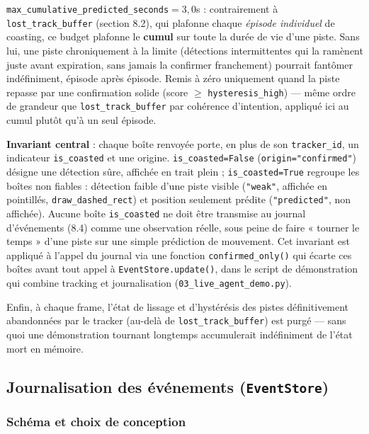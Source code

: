 \documentclass[11pt,a4paper]{article}
\let\Oldsubsection\subsection
\renewcommand{\subsection}{\FloatBarrier\Oldsubsection}
\let\Oldsubsubsection\subsubsection
\renewcommand{\subsubsection}{\FloatBarrier\Oldsubsubsection}
\begin{document}
\begin{itemize}[leftmargin=1.5em]
        \texttt{max\_cumulative\_predicted\_seconds}$=3,0$s : contrairement
        à \texttt{lost\_track\_buffer} (section 8.2), qui plafonne chaque
        \emph{épisode individuel} de coasting, ce budget plafonne le
        \textbf{cumul} sur toute la durée de vie d'une piste. Sans lui, une
        piste chroniquement à la limite (détections intermittentes qui la
        ramènent juste avant expiration, sans jamais la confirmer
        franchement) pourrait fantômer indéfiniment, épisode après épisode.
        Remis à zéro uniquement quand la piste repasse par une confirmation
        solide (score $\geq$ \texttt{hysteresis\_high}) --- même ordre de
        grandeur que \texttt{lost\_track\_buffer} par cohérence d'intention,
        appliqué ici au cumul plutôt qu'à un seul épisode.
    \end{itemize}
    
    \textbf{Invariant central} : chaque boîte renvoyée porte, en plus de son
    \texttt{tracker\_id}, un indicateur \texttt{is\_coasted} et une origine.
    \texttt{is\_coasted=False} (\texttt{origin="confirmed"}) désigne une
    détection sûre, affichée en trait plein ; \texttt{is\_coasted=True}
    regroupe les boîtes non fiables : détection faible d'une piste visible
    (\texttt{"weak"}, affichée en pointillés, \texttt{draw\_dashed\_rect})
    et position seulement prédite (\texttt{"predicted"}, non affichée).
    Aucune boîte \texttt{is\_coasted} ne doit être transmise au journal
    d'événements (8.4) comme une observation réelle, sous peine de faire
    « tourner le temps » d'une piste sur une simple prédiction de
    mouvement. Cet invariant est appliqué à l'appel du journal via une
    fonction \texttt{confirmed\_only()} qui écarte ces boîtes avant tout
    appel à \texttt{EventStore.update()}, dans le script de démonstration
    qui combine tracking et journalisation (\texttt{03\_live\_agent\_demo.py}).
    
    Enfin, à chaque frame, l'état de lissage et d'hystérésis des pistes
    définitivement abandonnées par le tracker (au-delà de
    \texttt{lost\_track\_buffer}) est purgé --- sans quoi une démonstration
    tournant longtemps accumulerait indéfiniment de l'état mort en mémoire.
    
    \subsection{Journalisation des événements (\texttt{EventStore})}
    
    \subsubsection{Schéma et choix de conception}
    
\end{document}
